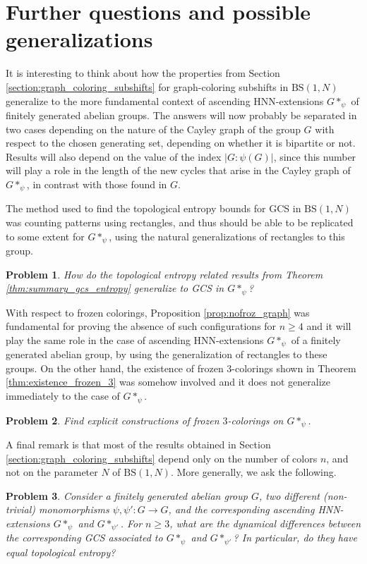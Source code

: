 \documentclass[cupthm,crop,info]{CUP-JNL-ETS}%
\theoremstyle{cupplain}
\newtheorem*{problem*}{Problem}
\theoremstyle{cupdefinition}
\theoremstyle{cupremark}
\theoremstyle{cupproof}
\numberwithin{equation}{section}
\newcommand{\BS}[1][N]{\mathrm{BS}(1,#1)}
\providecommand{\DIFadd}[1]{{\protect\color{blue}\uwave{#1}}} %
\providecommand{\DIFaddbegin}{} %
\providecommand{\DIFaddend}{} %
\newcommand{\DIFaddincludegraphics}[2][]{{\color{blue}\fbox{\DIFOincludegraphics[#1]{#2}}}} %
\DeclareRobustCommand{\DIFaddbegin}{\DIFOaddbegin \let\includegraphics\DIFaddincludegraphics} %
\DeclareRobustCommand{\DIFaddend}{\DIFOaddend \let\includegraphics\DIFOincludegraphics} %
\begin{document}
\section{Further questions and possible generalizations}
\label{section: further questions}

It is interesting to think about how the properties from Section \ref{section:graph_coloring_subshifts} for graph-coloring subshifts in $\BS$ generalize to the more fundamental context of ascending HNN-extensions $G*_{\psi}$ of finitely generated abelian groups. The answers will now probably be separated in two cases depending on the nature of the Cayley graph of the group $G$ with respect to the chosen generating set, depending on whether it is bipartite or not. Results will also depend on the value of the index $|G:\psi(G)|$, since this number will play a role in the length of the new cycles that arise in the Cayley graph of $G*_{\psi}$, in contrast with those found in $G$.

The method used to find the topological entropy bounds for GCS in $\BS$ was counting patterns using rectangles, and thus should be able to be replicated to some extent for $G*_{\psi}$, using the natural generalizations of rectangles to this group. 
\begin{problem*}
	How do the topological entropy related results from Theorem \ref{thm:summary_gcs_entropy} generalize to GCS in $G*_{\psi}$?
\end{problem*}
With respect to frozen colorings, Proposition \ref{prop:nofroz_graph} was fundamental for proving the absence of such configurations for $n\ge 4$ and it will play the same role in the case of ascending HNN-extensions $G*_{\psi}$ of a finitely generated abelian group, by using the generalization of rectangles to these groups. On the other hand, the existence of frozen $3$-colorings shown in Theorem \ref{thm:existence_frozen_3} was somehow involved and it does not generalize immediately to the case of $G*_{\psi}$.
\begin{problem*}
	Find explicit constructions of frozen $3$-colorings on $G*_{\psi}$.
\end{problem*}

A final remark is that most of the results obtained in Section \ref{section:graph_coloring_subshifts} depend only on the number of colors $n$, and not on the parameter $N$ of $\BS$. More generally, we ask the following.
\begin{problem*}
	Consider a finitely generated abelian group $G$, two different (non-trivial\DIFaddbegin \DIFadd{, non-surjective}\DIFaddend ) monomorphisms $\psi, \psi':G\to G$, and the corresponding ascending HNN-extensions $G*_{\psi}$ and $G*_{\psi'}$. For $n\ge 3$, what are the dynamical differences between the corresponding GCS associated to $G*_{\psi}$ and $G*_{\psi'}$? In particular, do they have equal topological entropy?
\end{problem*}
\end{document}
